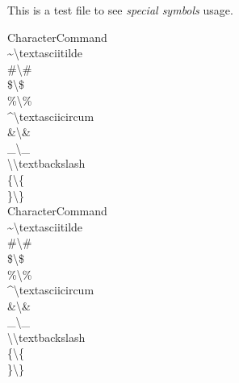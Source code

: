 \documentclass{article}
\newcommand\tab[1][1cm]{\hspace*{#1}}
\begin{document}
This is a test file to see \emph{special symbols} usage.

Character\quad Command\\
\textasciitilde\quad \textbackslash textasciitilde\\
\#\quad \textbackslash\#\\
\$\quad \textbackslash\$\\
\%\quad \textbackslash\%\\
\textasciicircum\quad \textbackslash textasciicircum\\

\&\quad \textbackslash\&\\
\_\quad \textbackslash\_\\
\textbackslash\quad \textbackslash textbackslash\\
\{\quad \textbackslash\{\\
\}\quad \textbackslash\}\\

Character\tab Command\\
\textasciitilde\tab\tab \textbackslash textasciitilde\\
\#\tab\tab \textbackslash\#\\
\$\tab\tab \textbackslash\$\\
\%\tab\tab \textbackslash\%\\
\textasciicircum\tab \textbackslash textasciicircum\\

\&\tab\tab \textbackslash\&\\
\_\tab\tab \textbackslash\_\\
\textbackslash\tab\tab \textbackslash textbackslash\\
\{\tab\tab \textbackslash\{\\
\}\tab\tab \textbackslash\}\\
\end{document}
